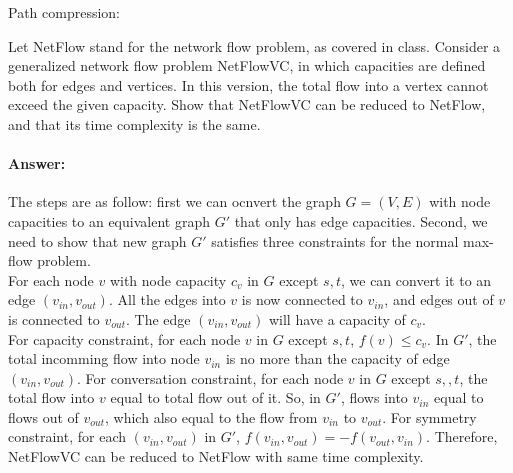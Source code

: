 \documentclass[11pt]{article}
\begin{document}
Path compression:




\begin{problem} 
Let {\sf NetFlow} stand for the network flow problem, as covered in class. Consider a generalized network flow problem {\sf NetFlowVC}, in which capacities are defined both for edges and vertices. In this version, the total flow into a vertex cannot exceed the given capacity. Show that {\sf NetFlowVC} can be reduced to {\sf NetFlow}, and that its time complexity is the same.
\end{problem}

\paragraph{Answer:}
The steps are as follow: first we can ocnvert the graph $G=(V,E)$ with node capacities to an equivalent graph $G'$ that only has edge capacities.
Second, we need to show that new graph $G'$ satisfies three constraints for the normal max-flow problem. \\
For each node $v$ with node capacity $c_v$ in $G$ except $s, t$, we can convert it to an edge $(v_{in}, v_{out})$. All the edges into $v$ is now connected to $v_{in}$, and edges out of $v$ is connected to $v_{out}$. The edge $(v_{in}, v_{out})$ will have a capacity of $c_v$. \\
For capacity constraint, for each node $v$ in $G$ except $s, t$, $f(v) \leq c_v$. In $G'$, the total incomming flow into node $v_{in}$ is no more than the capacity of edge $(v_{in}, v_{out})$.
For conversation constraint, for each node $v$ in $G$ except $s, ,t$, the total flow into $v$ equal to total flow out of it. So, in $G'$, flows into $v_{in}$ equal to flows out of $v_{out}$, which also equal to the flow from $v_{in}$ to $v_{out}$.
For symmetry constraint, for each $(v_{in}, v_{out})$ in $G'$, $f(v_{in}, v_{out}) = -f(v_{out}, v_{in})$.
Therefore, {\sf NetFlowVC} can be reduced to {\sf NetFlow} with same time complexity.
\end{document}
